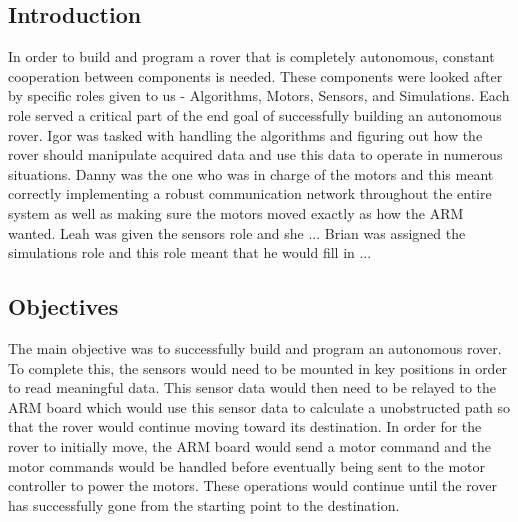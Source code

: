 




\usepackage[compact]{titlesec}





\subsection{Introduction}
In order to build and program a rover that is completely autonomous, constant cooperation between components is needed. These components were looked after by specific roles given to us - Algorithms, Motors, Sensors, and Simulations. Each role served a critical part of the end goal of successfully building an autonomous rover. Igor was tasked with handling the algorithms and figuring out how the rover should manipulate acquired data and use this data to operate in numerous situations. Danny was the one who was in charge of the motors and this meant correctly implementing a robust communication network throughout the entire system as well as making sure the motors moved exactly as how the ARM wanted. Leah was given the sensors role and she ... Brian was assigned the simulations role and this role meant that he would fill in ...

\subsection{Objectives}
The main objective was to successfully build and program an autonomous rover. To complete this, the sensors would need to be mounted in key positions in order to read meaningful data. This sensor data would then need to be relayed to the ARM board which would use this sensor data to calculate a unobstructed path so that the rover would continue moving toward its destination. In order for the rover to initially move, the ARM board would send a motor command and the motor commands would be handled before eventually being sent to the motor controller to power the motors. These operations would continue until the rover has successfully gone from the starting point to the destination.

